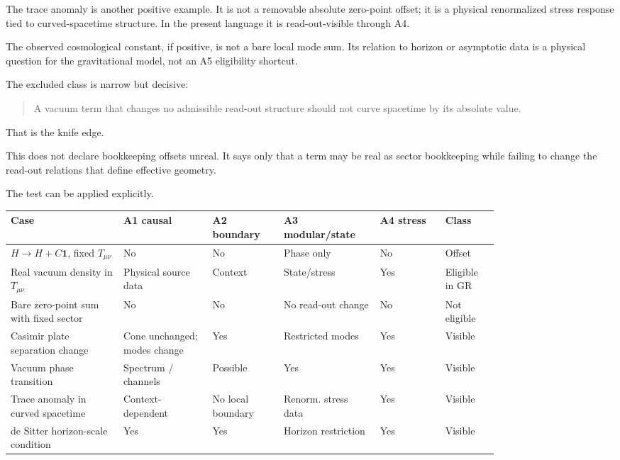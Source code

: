 \documentclass[12pt,a4paper]{article}
\theoremstyle{definition}
\theoremstyle{remark}
\begin{document}
The trace anomaly is another positive example. It is not a removable absolute zero-point offset; it is a physical renormalized stress response tied to curved-spacetime structure. In the present language it is read-out-visible through A4.

The observed cosmological constant, if positive, is not a bare local mode sum.  Its relation to horizon or asymptotic data is a physical question for the gravitational model, not an A5 eligibility shortcut.

The excluded class is narrow but decisive:

\begin{quote}
A vacuum term that changes no admissible read-out structure should not curve spacetime by its absolute value.
\end{quote}

That is the knife edge.

This does not declare bookkeeping offsets unreal. It says only that a term may be real as sector bookkeeping while failing to change the read-out relations that define effective geometry.

The test can be applied explicitly.

\begin{center}
\begin{tabular}{P{0.19\linewidth}P{0.15\linewidth}P{0.12\linewidth}P{0.14\linewidth}P{0.11\linewidth}P{0.09\linewidth}}
\toprule
\textbf{Case} & \textbf{A1 causal} & \textbf{A2 boundary} & \textbf{A3 modular/state} & \textbf{A4 stress} & \textbf{Class} \\
\midrule
$H\to H+C\mathbf1$, fixed $T_{\mu\nu}$ & No & No & Phase only & No & Offset \\
Real vacuum density in $T_{\mu\nu}$ & Physical source data & Context & State/stress & Yes & Eligible in GR \\
Bare zero-point sum with fixed sector & No & No & No read-out change & No & Not eligible \\
Casimir plate separation change & Cone unchanged; modes change & Yes & Restricted modes & Yes & Visible \\
Vacuum phase transition & Spectrum / channels & Possible & Yes & Yes & Visible \\
Trace anomaly in curved spacetime & Context-dependent & No local boundary & Renorm. stress data & Yes & Visible \\
de Sitter horizon-scale condition & Yes & Yes & Horizon restriction & Yes & Visible \\
\bottomrule
\end{tabular}
\end{center}
\end{document}
